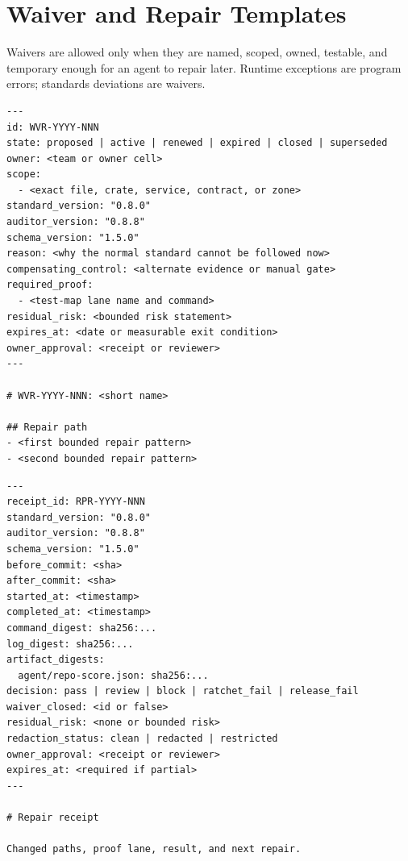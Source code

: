 \section{Waiver and Repair Templates}

Waivers are allowed only when they are named, scoped, owned, testable, and temporary enough for an agent to repair later. Runtime exceptions are program errors; standards deviations are waivers.

\begin{lstlisting}[style=codebox]
---
id: WVR-YYYY-NNN
state: proposed | active | renewed | expired | closed | superseded
owner: <team or owner cell>
scope:
  - <exact file, crate, service, contract, or zone>
standard_version: "0.8.0"
auditor_version: "0.8.8"
schema_version: "1.5.0"
reason: <why the normal standard cannot be followed now>
compensating_control: <alternate evidence or manual gate>
required_proof:
  - <test-map lane name and command>
residual_risk: <bounded risk statement>
expires_at: <date or measurable exit condition>
owner_approval: <receipt or reviewer>
---

# WVR-YYYY-NNN: <short name>

## Repair path
- <first bounded repair pattern>
- <second bounded repair pattern>
\end{lstlisting}

\begin{lstlisting}[style=codebox]
---
receipt_id: RPR-YYYY-NNN
standard_version: "0.8.0"
auditor_version: "0.8.8"
schema_version: "1.5.0"
before_commit: <sha>
after_commit: <sha>
started_at: <timestamp>
completed_at: <timestamp>
command_digest: sha256:...
log_digest: sha256:...
artifact_digests:
  agent/repo-score.json: sha256:...
decision: pass | review | block | ratchet_fail | release_fail
waiver_closed: <id or false>
residual_risk: <none or bounded risk>
redaction_status: clean | redacted | restricted
owner_approval: <receipt or reviewer>
expires_at: <required if partial>
---

# Repair receipt

Changed paths, proof lane, result, and next repair.
\end{lstlisting}
